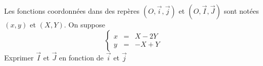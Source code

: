 Les fonctions coordonn{\'e}es dans des rep{\`e}res $(O,\overrightarrow{i}, \overrightarrow{j})$ et $(O,\overrightarrow{I}, \overrightarrow{J})$ sont not{\'e}es $(x,y)$ et $(X,Y)$. On suppose\[\left\lbrace \begin{array}{ccc}
x & = & X-2Y \\ y & = & -X+Y \end{array} \right.\] Exprimer $\overrightarrow{I}$ et $\overrightarrow{J}$ en fonction de $\overrightarrow{i}$ et $\overrightarrow{j}$ \bigskip \bigskip \bigskip